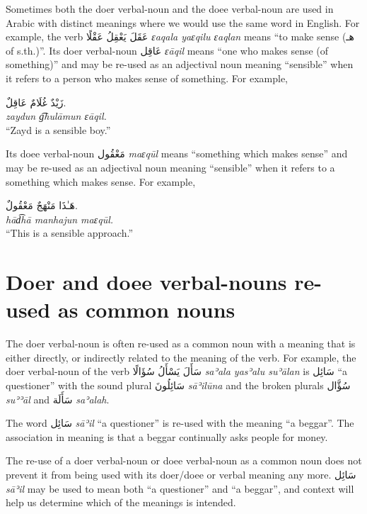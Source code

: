\documentclass[
  10pt,
]{book}
\begin{document}
Sometimes both the doer verbal-noun and the doee verbal-noun are used in Arabic with distinct meanings where we would use the same word in English. For example, the verb
\foreignlanguage{arabic}{عَقَلَ يَعْقِلُ عَقْلًا} \emph{ɛaqala yaɛqilu ɛaqlan} means \enquote{to make sense (\foreignlanguage{arabic}{هـ} of s.th.)}.
Its doer verbal-noun \foreignlanguage{arabic}{عَاقِل} \emph{ɛāqil} means \enquote{one who makes sense (of something)} and may be re-used as an adjectival noun meaning \enquote{sensible} when it refers to a person who makes sense of something. For example,

\foreignlanguage{arabic}{زَيْدٌ غُلَامٌ عَاقِلٌ.}\\
\emph{zaydun g͡hulāmun ɛāqil.}\\
\enquote{Zayd is a sensible boy.}

Its doee verbal-noun \foreignlanguage{arabic}{مَعْقُول} \emph{maɛqūl} means \enquote{something which makes sense} and may be re-used as an adjectival noun meaning \enquote{sensible} when it refers to a something which makes sense. For example,

\foreignlanguage{arabic}{هَـٰذَا مَنْهَجٌ مَعْقُولٌ.}\\
\emph{hād͡hā manhajun maɛqūl.}\\
\enquote{This is a sensible approach.}

\section{Doer and doee verbal-nouns re-used as common nouns}\label{doer-and-doee-verbal-nouns-re-used-as-common-nouns}

The doer verbal-noun is often re-used as a common noun with a meaning that is either directly, or indirectly related to the meaning of the verb. For example, the doer verbal-noun of the verb \foreignlanguage{arabic}{سَأَلَ يَسْأَلُ سُؤَالًا} \emph{saʾala yasʾalu suʾālan} is \foreignlanguage{arabic}{سَائِل} \enquote{a questioner} with the sound plural \foreignlanguage{arabic}{سَائِلُونَ} \emph{sāʾilūna} and the broken plurals \foreignlanguage{arabic}{سُؤَّال} \emph{suʾʾāl} and \foreignlanguage{arabic}{سَأَلَة} \emph{saʾalah}.

The word \foreignlanguage{arabic}{سَائِل} \emph{sāʾil} \enquote{a questioner} is re-used with the meaning \enquote{a beggar}. The association in meaning is that a beggar continually asks people for money.

The re-use of a doer verbal-noun or doee verbal-noun as a common noun does not prevent it from being used with its doer/doee or verbal meaning any more.
\foreignlanguage{arabic}{سَائِل} \emph{sāʾil} may be used to mean both \enquote{a questioner} and \enquote{a beggar}, and context will help us determine which of the meanings is intended.
\end{document}
